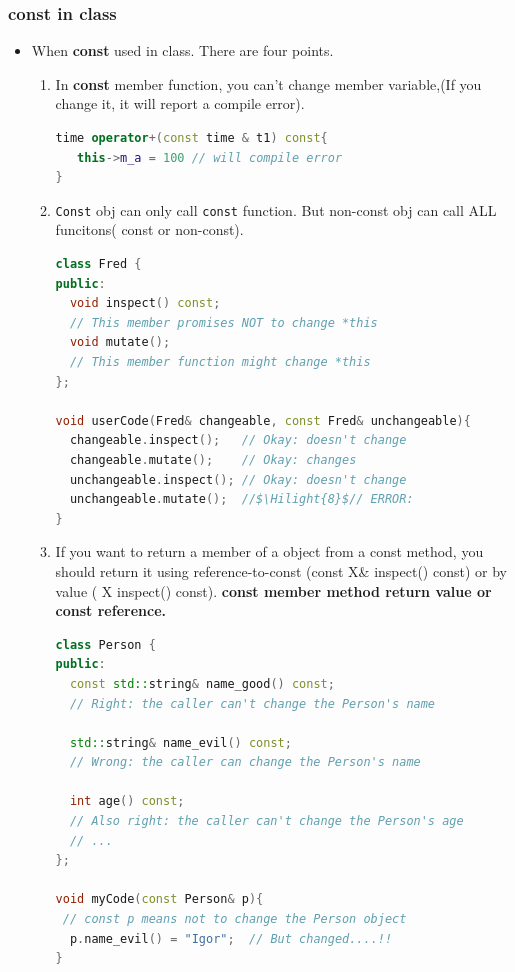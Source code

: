 \documentclass[a4paper,12pt,twoside]{book}
\newcommand{\Hilight}[1]{\makebox[0pt][l]{\color{yellow}\rule[-3pt]{#1em}{11pt}}}
\begin{document}
\subsubsection{const in class}
\begin{itemize}

\item When \textbf{const} used in class. There are four points.
\begin{enumerate}
\item In \textbf{const} member function, you can't change member variable,(If you change it, it will report a compile error).
\begin{lstlisting}[frame=single, language=c++]
time operator+(const time & t1) const{
   this->m_a = 100 // will compile error
}
\end{lstlisting}

\item \texttt{Const} obj can only call \texttt{const} function. But non-const obj can call ALL funcitons( const or non-const).
\begin{lstlisting}[frame=single, language=c++, mathescape=true]
class Fred {
public:
  void inspect() const;
  // This member promises NOT to change *this
  void mutate();
  // This member function might change *this
};

void userCode(Fred& changeable, const Fred& unchangeable){
  changeable.inspect();   // Okay: doesn't change
  changeable.mutate();    // Okay: changes
  unchangeable.inspect(); // Okay: doesn't change
  unchangeable.mutate();  //$\Hilight{8}$// ERROR:
}
\end{lstlisting}

\item If you want to return a member of a object from a const method, you should return it using reference-to-const (const X\& inspect() const) or by value ( X inspect() const). \textbf{const member method return value or const reference.}
\begin{lstlisting}[frame=single, language=c++]
class Person {
public:
  const std::string& name_good() const;
  // Right: the caller can't change the Person's name

  std::string& name_evil() const;
  // Wrong: the caller can change the Person's name

  int age() const;
  // Also right: the caller can't change the Person's age
  // ...
};

void myCode(const Person& p){
 // const p means not to change the Person object
  p.name_evil() = "Igor";  // But changed....!!
}
\end{lstlisting}


\end{enumerate}
\end{itemize}
\end{document}
